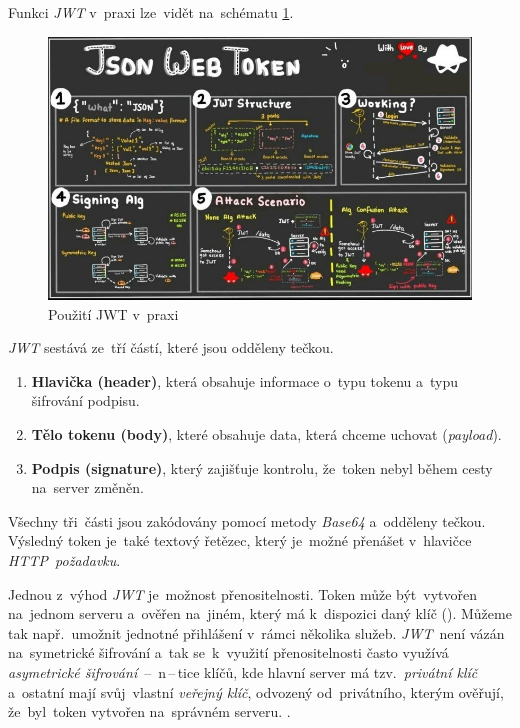 \documentclass[10pt,a4paper]{article}
\begin{document}
            Funkci \emph{JWT} v~praxi lze~vidět na~schématu \ref{model-jwt}.

            \begin{figure}
                \centering
                \includegraphics[width=.8\linewidth]{img/jwt.jpg}
                \caption{Použití JWT v~praxi}
                \label{model-jwt}
            \end{figure}

            \emph{JWT} sestává ze~tří částí, které jsou odděleny tečkou.
            
            \begin{enumerate}
                \item \textbf{Hlavička (header)}, která obsahuje informace o~typu tokenu a~typu šifrování podpisu.
                \item \textbf{Tělo tokenu (body)}, které obsahuje data, která chceme uchovat (\emph{payload}).
                \item \textbf{Podpis (signature)}, který zajišťuje kontrolu, že~token nebyl během cesty na~server změněn.
            \end{enumerate}

            Všechny tři~části jsou zakódovány pomocí metody \emph{Base64} a~odděleny tečkou. Výsledný token je~také textový řetězec, který je~možné přenášet v~hlavičce \emph{HTTP~požadavku}.

            Jednou z~výhod \emph{JWT} je~možnost přenositelnosti. Token může být~vytvořen na~jednom serveru a~ověřen na~jiném, který má k~dispozici daný klíč (\cite{ieee:jwt}). Můžeme tak např.~umožnit jednotné přihlášení v~rámci několika služeb. \emph{JWT}~není vázán na~symetrické šifrování a~tak se~k~využití přenositelnosti často využívá \emph{asymetrické šifrování}~--~n\,--\,tice klíčů, kde hlavní server má tzv.~\emph{privátní klíč} a~ostatní mají svůj~vlastní \emph{veřejný klíč}, odvozený od~privátního, kterým ověřují, že~byl~token vytvořen na~správném serveru. \cite{miguelgrinbergJSONTokens}.
            
\end{document}
